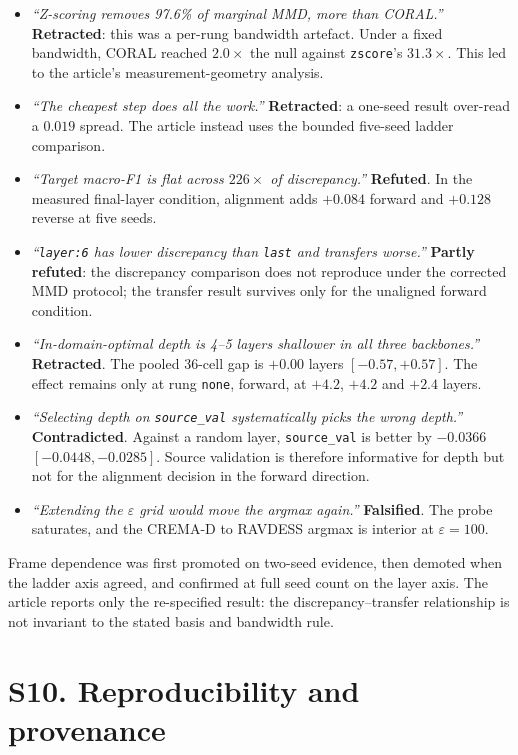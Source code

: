 \documentclass[a4paper,fleqn]{cas-dc}
\begin{document}
\begin{itemize}
  \item \emph{``Z-scoring removes 97.6\% of marginal MMD, more than CORAL.''}
    \textbf{Retracted}: this was a per-rung bandwidth artefact. Under a fixed
    bandwidth, CORAL reached $2.0\times$ the null against \texttt{zscore}'s
    $31.3\times$. This led to the article's measurement-geometry analysis.
  \item \emph{``The cheapest step does all the work.''} \textbf{Retracted}:
    a one-seed result over-read a $0.019$ spread. The article instead uses the
    bounded five-seed ladder comparison.
  \item \emph{``Target macro-F1 is flat across $226\times$ of discrepancy.''}
    \textbf{Refuted}. In the measured final-layer condition, alignment adds
    $+0.084$ forward and $+0.128$ reverse at five seeds.
  \item \emph{``\texttt{layer:6} has lower discrepancy than \texttt{last} and
    transfers worse.''} \textbf{Partly refuted}: the discrepancy comparison
    does not reproduce under the corrected MMD protocol; the transfer result
    survives only for the unaligned forward condition.
  \item \emph{``In-domain-optimal depth is 4--5 layers shallower in all three
    backbones.''} \textbf{Retracted}. The pooled 36-cell gap is $+0.00$ layers
    $[-0.57, +0.57]$. The effect remains only at rung \texttt{none}, forward,
    at $+4.2$, $+4.2$ and $+2.4$ layers.
  \item \emph{``Selecting depth on \texttt{source\_val} systematically picks
    the wrong depth.''} \textbf{Contradicted}. Against a random layer,
    \texttt{source\_val} is better by $-0.0366$ $[-0.0448, -0.0285]$.
    Source validation is therefore informative for depth but not for the
    alignment decision in the forward direction.
  \item \emph{``Extending the $\varepsilon$ grid would move the argmax
    again.''} \textbf{Falsified}. The probe saturates, and the CREMA-D to
    RAVDESS argmax is interior at $\varepsilon = 100$.
\end{itemize}

Frame dependence was first promoted on two-seed evidence, then demoted when
the ladder axis agreed, and confirmed at full seed count on the layer axis.
The article reports only the re-specified result: the discrepancy--transfer
relationship is not invariant to the stated basis and bandwidth rule.

\section*{S10. Reproducibility and provenance}
\label{sec:s-repro}
\end{document}
